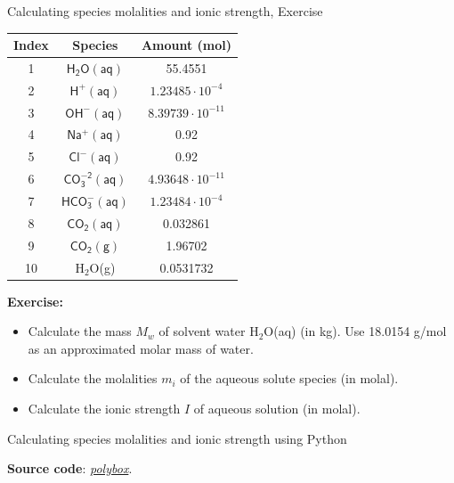 %
%
\begin{frame}{Calculating species molalities and ionic strength,  Exercise}

\lcol
\begin{center}
\begin{tabular}{ccc}
\toprule 
\textbf{Index} & \textbf{Species} & \textbf{Amount (mol)}\tabularnewline
\midrule
1 & \textrm{$\mathsf{H_{2}O(aq)}$} & 55.4551\tabularnewline
2 & \textrm{$\mathsf{H^{+}(aq)}$} & $1.23485\cdot10^{-4}$\tabularnewline
3 & \textrm{$\mathsf{OH^{-}(aq)}$} & $8.39739\cdot10^{-11}$\tabularnewline
4 & \textrm{$\mathsf{Na^{+}(aq)}$} & 0.92\tabularnewline
5 & \textrm{$\mathsf{Cl^{-}(aq)}$} & 0.92\tabularnewline
6 & \textrm{$\mathsf{CO_{3}^{-2}(aq)}$} & $4.93648\cdot10^{-11}$\tabularnewline
7 & \textrm{$\mathsf{HCO_{3}^{-}(aq)}$} & $1.23484\cdot10^{-4}$\tabularnewline
8 & \textrm{$\mathsf{CO_{2}(aq)}$} & 0.032861\tabularnewline
9 & \textrm{$\mathsf{CO_{2}(g)}$} & 1.96702\tabularnewline
10 & H$_{2}$O(g) & 0.0531732\tabularnewline
\bottomrule
\end{tabular}
\par\end{center}

\rcol

\textbf{Exercise:}
\begin{itemize}
\item Calculate the mass $M_{w}$ of solvent water H$_{2}$O(aq) (in kg).
Use 18.0154 g/mol as an approximated molar mass of water.
\item Calculate the molalities $m_{i}$ of the aqueous solute species (in
molal).
\item Calculate the ionic strength $I$ of aqueous solution (in molal).
\end{itemize}

\ecol
\end{frame}
%
%
\begin{frame}{Calculating species molalities and ionic strength using Python}



\textbf{Source code}: \href{https://polybox.ethz.ch/index.php/s/xmvAZqB9bcGvEz3}{\textcolor{indigo(dye)}{\it polybox}}.

\end{frame}
